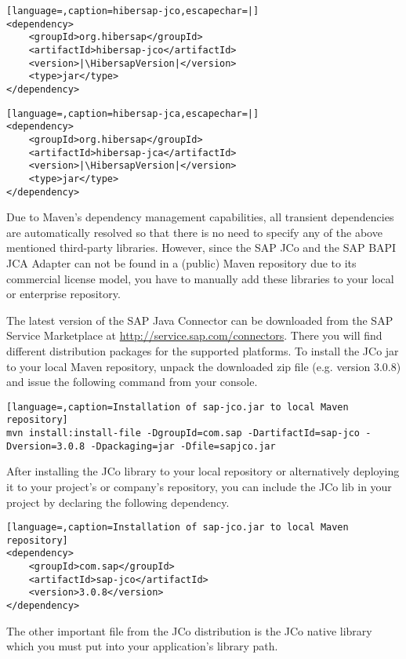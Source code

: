 \begin{lstlisting}[language=,caption=hibersap-jco,escapechar=|]
<dependency>
    <groupId>org.hibersap</groupId>
    <artifactId>hibersap-jco</artifactId>
    <version>|\HibersapVersion|</version>
    <type>jar</type>
</dependency>
\end{lstlisting}

\begin{lstlisting}[language=,caption=hibersap-jca,escapechar=|]
<dependency>
    <groupId>org.hibersap</groupId>
    <artifactId>hibersap-jca</artifactId>
    <version>|\HibersapVersion|</version>
    <type>jar</type>
</dependency>
\end{lstlisting}

Due to Maven's dependency management capabilities, all transient dependencies are automatically resolved so that there is no need to specify any of the above mentioned third-party libraries. However, since the SAP JCo and the SAP BAPI JCA Adapter can not be found in a (public) Maven repository due to its commercial license model, you have to manually add these libraries to your local or enterprise repository.

The latest version of the SAP Java Connector can be downloaded from the SAP Service Marketplace at 
\url{http://service.sap.com/connectors}. There you will find different distribution packages for the supported platforms.
To install the JCo jar to your local Maven repository, unpack the downloaded zip file (e.g. version 3.0.8) and 
issue the following command from your console.

\begin{lstlisting}[language=,caption=Installation of sap-jco.jar to local Maven repository]
mvn install:install-file -DgroupId=com.sap -DartifactId=sap-jco -Dversion=3.0.8 -Dpackaging=jar -Dfile=sapjco.jar
\end{lstlisting}

After installing the JCo library to your local repository or alternatively deploying it to your project's or company's repository, you can include the JCo lib in your project by declaring the following dependency.

\begin{lstlisting}[language=,caption=Installation of sap-jco.jar to local Maven repository]
<dependency>
    <groupId>com.sap</groupId>
    <artifactId>sap-jco</artifactId>
    <version>3.0.8</version>
</dependency>
\end{lstlisting}


The other important file from the JCo distribution is the JCo native library which you must put into your application's library path.
